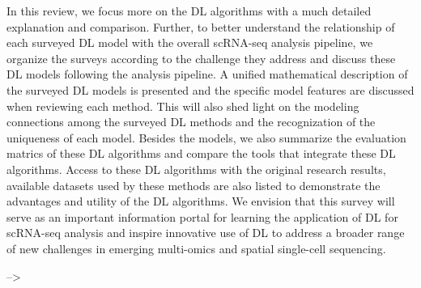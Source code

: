 \documentclass[
]{book}
\begin{document}
In this review, we focus more on the DL algorithms with a much detailed explanation and comparison. Further, to better understand the relationship of each surveyed DL model with the overall scRNA-seq analysis pipeline, we organize the surveys according to the challenge they address and discuss these DL models following the analysis pipeline. A unified mathematical description of the surveyed DL models is presented and the specific model features are discussed when reviewing each method. This will also shed light on the modeling connections among the surveyed DL methods and the recognization of the uniqueness of each model. Besides the models, we also summarize the evaluation matrics of these DL algorithms and compare the tools that integrate these DL algorithms. Access to these DL algorithms with the original research results, available datasets used by these methods are also listed to demonstrate the advantages and utility of the DL algorithms. We envision that this survey will serve as an important information portal for learning the application of DL for scRNA-seq analysis and inspire innovative use of DL to address a broader range of new challenges in emerging multi-omics and spatial single-cell sequencing.

--\textgreater{}

  
\end{document}
